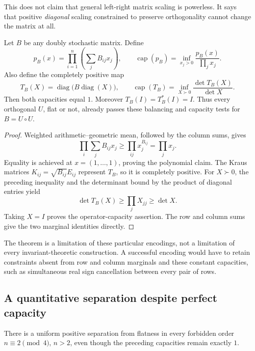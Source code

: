 This does not claim that general left-right matrix scaling is powerless.
It says that positive \emph{diagonal} scaling constrained to preserve
orthogonality cannot change the matrix at all.

\begin{proposition}
Let $B$ be any doubly stochastic matrix. Define
\[
 p_B(x)=\prod_{i=1}^n\left(\sum_j B_{ij}x_j\right),\qquad
 \operatorname{cap}(p_B)=\inf_{x_j>0}\frac{p_B(x)}{\prod_jx_j}.
\]
Also define the completely positive map
\[
 T_B(X)=\operatorname{diag}\bigl(B\operatorname{diag}(X)\bigr),
 \qquad
 \operatorname{cap}(T_B)=\inf_{X\succ0}
       \frac{\det T_B(X)}{\det X}.
\]
Then both capacities equal $1$. Moreover
$T_B(I)=T_B^*(I)=I$. Thus every orthogonal $U$, flat or not,
already passes these balancing and capacity tests for $B=U\circ U$.
\end{proposition}
\begin{proof}
Weighted arithmetic--geometric mean, followed by the column sums, gives
\[
 \prod_i\sum_jB_{ij}x_j
 \ge\prod_{ij}x_j^{B_{ij}}=\prod_jx_j.
\]
Equality is achieved at $x=(1,\ldots,1)$, proving the polynomial claim.
The Kraus matrices $K_{ij}=\sqrt{B_{ij}}E_{ij}$ represent $T_B$, so it
is completely positive. For $X\succ0$, the preceding inequality and
the determinant bound by the product of diagonal entries yield
\[
 \det T_B(X)\ge\prod_jX_{jj}\ge\det X.
\]
Taking $X=I$ proves the operator-capacity assertion. The row and column
sums give the two marginal identities directly.
\end{proof}

The theorem is a limitation of these particular encodings, not a
limitation of every invariant-theoretic construction. A successful
encoding would have to retain constraints absent from row and column
marginals and these constant capacities, such as simultaneous real
sign cancellation between every pair of rows.

\subsection{A quantitative separation despite perfect capacity}
There is a uniform positive separation from flatness in every forbidden
order $n\equiv2\pmod4$, $n>2$, even though the preceding capacities
remain exactly $1$.

